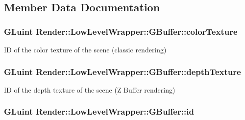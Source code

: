 \subsection{Member Data Documentation}
\subsubsection[{\texorpdfstring{color\+Texture}{colorTexture}}]{\setlength{\rightskip}{0pt plus 5cm}G\+Luint Render\+::\+Low\+Level\+Wrapper\+::\+G\+Buffer\+::color\+Texture}\hypertarget{struct_render_1_1_low_level_wrapper_1_1_g_buffer_aedd59e52f0f2bc1e3188670fa41a4549}{}\label{struct_render_1_1_low_level_wrapper_1_1_g_buffer_aedd59e52f0f2bc1e3188670fa41a4549}


ID of the color texture of the scene (classic rendering) 

\subsubsection[{\texorpdfstring{depth\+Texture}{depthTexture}}]{\setlength{\rightskip}{0pt plus 5cm}G\+Luint Render\+::\+Low\+Level\+Wrapper\+::\+G\+Buffer\+::depth\+Texture}\hypertarget{struct_render_1_1_low_level_wrapper_1_1_g_buffer_ae43189afa9a4b5514be7175321a85ab2}{}\label{struct_render_1_1_low_level_wrapper_1_1_g_buffer_ae43189afa9a4b5514be7175321a85ab2}


ID of the depth texture of the scene (Z Buffer rendering) 

\subsubsection[{\texorpdfstring{id}{id}}]{\setlength{\rightskip}{0pt plus 5cm}G\+Luint Render\+::\+Low\+Level\+Wrapper\+::\+G\+Buffer\+::id}\hypertarget{struct_render_1_1_low_level_wrapper_1_1_g_buffer_a73b756833b81a07d96bbb2c7928349cf}{}\label{struct_render_1_1_low_level_wrapper_1_1_g_buffer_a73b756833b81a07d96bbb2c7928349cf}


